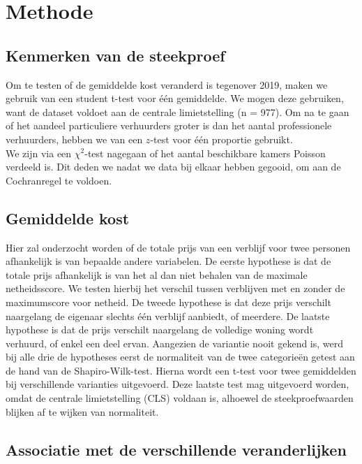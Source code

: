 \documentclass[a4paper]{kulakarticle}
\begin{document}
	\section{Methode}
	
	\subsection{Kenmerken van de steekproef}
Om te testen of de gemiddelde kost veranderd is tegenover 2019, maken we gebruik van een student t-test voor één gemiddelde. We mogen deze gebruiken, want de dataset voldoet aan de centrale limietstelling (n = 977). Om na te gaan of het aandeel particuliere verhuurders groter is dan het aantal professionele verhuurders, hebben we van een $z$-test voor één proportie gebruikt.\\
 
 We zijn via een $\chi ^2$-test nagegaan of het aantal beschikbare kamers Poisson verdeeld is. Dit deden we nadat we data bij elkaar hebben gegooid, om aan de Cochranregel te voldoen.
	
	\subsection{Gemiddelde kost}
	
	Hier zal onderzocht worden of de totale prijs van een verblijf voor twee personen afhankelijk is van bepaalde andere variabelen.
	De eerste hypothese is dat de totale prijs afhankelijk is van het al dan niet behalen van de maximale netheidsscore. We testen hierbij het verschil tussen verblijven met en zonder de maximumscore voor netheid.
	De tweede hypothese is dat deze prijs verschilt naargelang de eigenaar slechts één verblijf aanbiedt, of meerdere.
	De laatste hypothese is dat de prijs verschilt naargelang de volledige woning wordt verhuurd, of enkel een deel ervan.
	Aangezien de variantie nooit gekend is, werd bij alle drie de hypotheses eerst de normaliteit van de twee categorieën getest aan de hand van de Shapiro-Wilk-test. Hierna wordt een t-test voor twee gemiddelden bij verschillende varianties uitgevoerd. Deze laatste test mag uitgevoerd worden, omdat de centrale limietstelling (CLS) voldaan is, alhoewel de steekproefwaarden blijken af te wijken van normaliteit.

	\subsection{Associatie met de verschillende veranderlijken}
	
\end{document}
